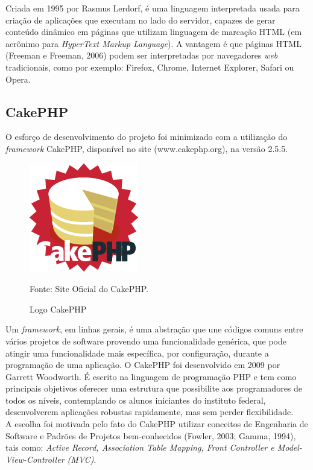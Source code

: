 Criada em 1995 por Rasmus Lerdorf, é uma linguagem interpretada usada para criação de aplicações que executam no lado do servidor, capazes de gerar conteúdo dinâmico em páginas que utilizam linguagem de marcação HTML (em acrônimo para {\it HyperText Markup Language}). A vantagem é que páginas HTML (Freeman e Freeman, 2006) podem ser interpretadas por navegadores {\it web} tradicionais, como por exemplo: Firefox, Chrome, Internet Explorer, Safari ou Opera.


\subsection{CakePHP}
O esforço de desenvolvimento do projeto foi minimizado com a utilização do {\it framework} CakePHP, disponível no site (www.cakephp.org), na versão 2.5.5. 

\begin{figure}[!htb]
	\centering
	\includegraphics[scale=0.50
	]{imagens/cake-logo}
	\caption{Logo CakePHP}
	Fonte: Site Oficial do CakePHP.
	\label{Rotulo}
\end{figure}

Um {\it framework}, em linhas gerais, é uma abstração que une códigos comuns entre vários projetos de software provendo uma funcionalidade genérica, que pode atingir uma funcionalidade mais específica, por configuração, durante a programação de uma aplicação. O CakePHP foi desenvolvido em 2009 por Garrett Woodworth. É escrito na linguagem de programação PHP e tem como principais objetivos oferecer uma estrutura que possibilite aos programadores de todos os níveis, contemplando os alunos iniciantes do instituto federal, desenvolverem aplicações robustas rapidamente, mas sem perder flexibilidade.
\\
\indent
A escolha foi motivada pelo fato do CakePHP utilizar conceitos de Engenharia de Software e Padrões de Projetos bem-conhecidos (Fowler, 2003; Gamma, 1994), tais como: {\it Active Record, Association Table Mapping, Front Controller e Model-View-Controller (MVC)}.


